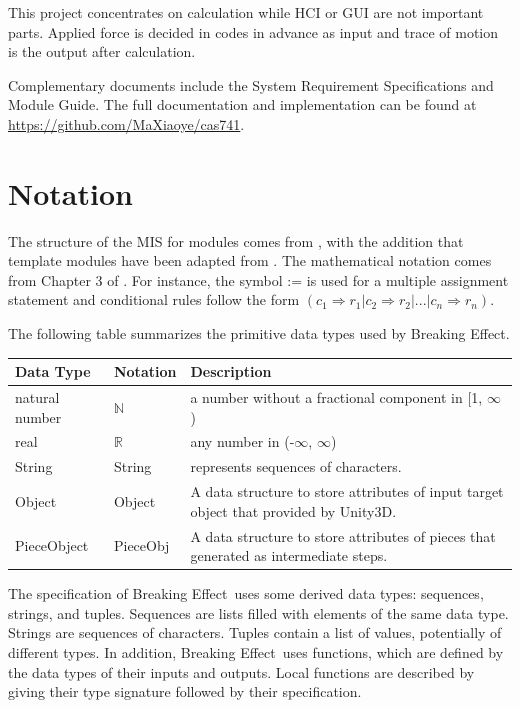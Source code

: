 \documentclass[12pt, titlepage]{article}
\newcommand{\progname}{Breaking Effect}
\begin{document}
This project concentrates on calculation while
HCI or GUI are not important parts. Applied force is decided in codes in advance as input
and trace of motion is the output after calculation.

Complementary documents include the System Requirement Specifications
and Module Guide.  The full documentation and implementation can be
found at \url{https://github.com/MaXiaoye/cas741}.

\section{Notation}

The structure of the MIS for modules comes from \citet{HoffmanAndStrooper1995},
with the addition that template modules have been adapted from
\cite{GhezziEtAl2003}.  The mathematical notation comes from Chapter 3 of
\citet{HoffmanAndStrooper1995}.  For instance, the symbol := is used for a
multiple assignment statement and conditional rules follow the form $(c_1
\Rightarrow r_1 | c_2 \Rightarrow r_2 | ... | c_n \Rightarrow r_n )$.

The following table summarizes the primitive data types used by \progname. 

\begin{center}
\renewcommand{\arraystretch}{1.2}
\noindent 
\begin{tabular}{l l p{7.5cm}} 
\toprule 
\textbf{Data Type} & \textbf{Notation} & \textbf{Description}\\ 
\midrule
natural number & $\mathbb{N}$ & a number without a fractional component in [1, $\infty$) \\
real & $\mathbb{R}$ & any number in (-$\infty$, $\infty$)\\
String & String & represents sequences of characters.\\
Object & Object & A data structure to store attributes of input target object that provided by Unity3D.\\
PieceObject & PieceObj & A data structure to store attributes of pieces that generated as intermediate steps.\\
\bottomrule
\end{tabular} 
\end{center}

\noindent
The specification of \progname \ uses some derived data types: sequences, strings, and
tuples. Sequences are lists filled with elements of the same data type. Strings
are sequences of characters. Tuples contain a list of values, potentially of
different types. In addition, \progname \ uses functions, which
are defined by the data types of their inputs and outputs. Local functions are
described by giving their type signature followed by their specification.
\end{document}
